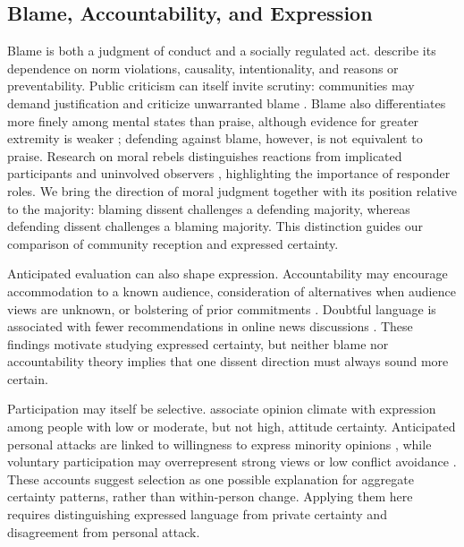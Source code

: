 \subsection{Blame, Accountability, and Expression}
\label{subsec:related-selective-expression}

Blame is both a judgment of conduct and a socially regulated act. \citet{malle2014blame} describe its dependence on norm violations, causality, intentionality, and reasons or preventability. Public criticism can itself invite scrutiny: communities may demand justification and criticize unwarranted blame \cite{malle2022socially}. Blame also differentiates more finely among mental states than praise, although evidence for greater extremity is weaker \cite{guglielmo2019asymmetric}; defending against blame, however, is not equivalent to praise. Research on moral rebels distinguishes reactions from implicated participants and uninvolved observers \cite{monin2008rejection}, highlighting the importance of responder roles. We bring the direction of moral judgment together with its position relative to the majority: blaming dissent challenges a defending majority, whereas defending dissent challenges a blaming majority. This distinction guides our comparison of community reception and expressed certainty.

Anticipated evaluation can also shape expression. Accountability may encourage accommodation to a known audience, consideration of alternatives when audience views are unknown, or bolstering of prior commitments \cite{tetlock1989strategies}. Doubtful language is associated with fewer recommendations in online news discussions \cite{evans2023doubt}. These findings motivate studying expressed certainty, but neither blame nor accountability theory implies that one dissent direction must always sound more certain.

Participation may itself be selective. \citet{matthes2010spiral} associate opinion climate with expression among people with low or moderate, but not high, attitude certainty. Anticipated personal attacks are linked to willingness to express minority opinions \cite{neubaum2018sanctions}, while voluntary participation may overrepresent strong views or low conflict avoidance \cite{settle2025promise}. These accounts suggest selection as one possible explanation for aggregate certainty patterns, rather than within-person change. Applying them here requires distinguishing expressed language from private certainty and disagreement from personal attack.


